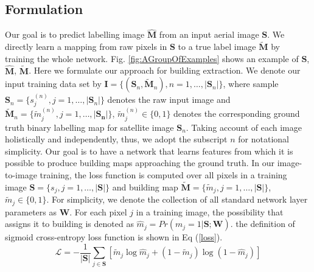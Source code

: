 \documentclass[runningheads]{llncs}
\begin{document}
\subsection{Formulation}
   Our goal is to predict labelling image $\mathbf{\hat{M}}$ from an input aerial image $\mathbf{S}$.  We directly learn a mapping from raw pixels in $\mathbf{S}$ to a true label image  $\mathbf{\tilde{M}}$ by training the whole network. Fig. \ref{fig:AGroupOfExamples} shows an example of $\mathbf{S}$, $\mathbf{\hat{M}}$, $\mathbf{\tilde{M}}$. Here we formulate our approach for building extraction. We denote our input training data set by $\mathbf{I} = \{(\mathbf{S}_{n},\mathbf{\tilde{M}}_{n}),n = 1,\ldots,\vert \mathbf{S}_n \vert \}$, where sample $\mathbf{S}_{n} = \{s_{j}^{(n)}, j = 1,\ldots,\vert \mathbf{S}_n \vert \}$ denotes the raw input image and  $\mathbf{\tilde{M}}_{n} = \{\tilde{m}_{j}^{(n)}, j = 1,\ldots,\vert \mathbf{S_n} \vert\}$, $\tilde{m}_j^{(n)} \in \{0,1\}$ denotes the corresponding ground truth binary labelling map for satellite image $\mathbf{S}_{n}$.  Taking account of each image holistically and independently, thus, we adopt the subscript $n$ for notational simplicity. Our goal is to have a network that learns features from which it is possible to produce building maps approaching the ground truth. In our image-to-image training, the loss function is computed over all pixels in a training image $\mathbf{S} = \{s_{j}, j = 1,\ldots,\vert \mathbf{S} \vert\}$ and building map $\mathbf{\tilde{M}} = \{\tilde{m}_{j}, j = 1,\ldots,\vert \mathbf{S} \vert\}$, $\tilde{m}_j \in \{0,1\}$.
For simplicity, we denote the collection of all standard network layer parameters as $\mathbf{W}$. For each pixel $j$ in a training image, the possibility that assigns it to building is denoted as $\hat{m}_j = Pr(m_j = 1|\mathbf{S};\mathbf{W})$. the definition of sigmoid cross-entropy loss function is shown in Eq (\ref{loss}).
\begin{equation}
	\label{loss}
    \mathcal{L} = - \frac{1}{\vert \mathbf{S} \vert} \sum_{j \in \mathbf{S}} \left[ \tilde{m}_j \log{\hat{m}_j} + (1 - \tilde{m}_j)\log{(1 - \hat{m}_j)} \right]
\end{equation}

\end{document}
